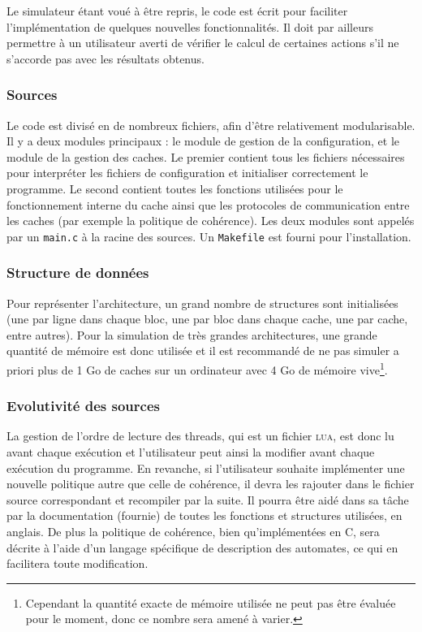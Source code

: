 Le simulateur étant voué à être repris, le code est écrit pour faciliter l'implémentation de quelques nouvelles fonctionnalités. Il doit par ailleurs permettre à un utilisateur averti de vérifier le calcul de certaines actions s'il ne s'accorde pas avec les résultats obtenus.

\subsubsection{Sources}

Le code est divisé en de nombreux fichiers, afin d'être relativement modularisable. Il y a deux modules principaux : le module de gestion de la configuration, et le module de la gestion des caches. Le premier contient tous les fichiers nécessaires pour interpréter les fichiers de configuration et initialiser correctement le programme. Le second contient toutes les fonctions utilisées pour le fonctionnement interne du cache ainsi que les protocoles de communication entre les caches (par exemple la politique de cohérence). Les deux modules sont appelés par un \verb!main.c! à la racine des sources. Un \verb!Makefile! est fourni pour l'installation.

\subsubsection{Structure de données}

Pour représenter l'architecture, un grand nombre de structures sont initialisées (une par ligne dans chaque bloc, une par bloc dans chaque cache, une par cache, entre autres). Pour la simulation de très grandes architectures, une grande quantité de mémoire est donc utilisée et il est recommandé de ne pas simuler a priori plus de 1 Go de caches sur un ordinateur avec 4 Go de mémoire vive\footnote{Cependant la quantité exacte de mémoire utilisée ne peut pas être évaluée pour le moment, donc ce nombre sera amené à varier.}.

\subsubsection{Evolutivité des sources}

La gestion de l'ordre de lecture des threads, qui est un fichier \textsc{lua}, est donc lu avant chaque exécution et l'utilisateur peut ainsi la modifier avant chaque exécution du programme. En revanche, si l'utilisateur souhaite implémenter une nouvelle politique autre que celle de cohérence, il devra les rajouter dans le fichier source correspondant et recompiler par la suite. Il pourra être aidé dans sa tâche par la documentation (fournie) de toutes les fonctions et structures utilisées, en anglais. De plus la politique de cohérence, bien qu'implémentées en \textsc{C}, sera décrite à l'aide d'un langage spécifique de description des automates, ce qui en facilitera toute modification.
